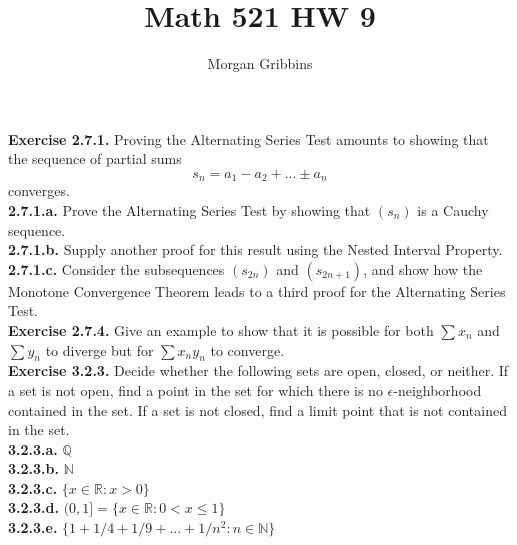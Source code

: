 \documentclass[12pt,letterpaper]{article}
\title{Math 521 HW 9}
\author{Morgan Gribbins}
\date{}
\begin{document}
	
\maketitle

\textbf{Exercise 2.7.1.} Proving the Alternating Series Test amounts to showing that the sequence of partial sums \[s_{n} = a_{1} - a_{2} + ... \pm a_{n}\] converges. \\

\textbf{2.7.1.a.} Prove the Alternating Series Test by showing that \((s_{n})\) is a Cauchy sequence. \\



\textbf{2.7.1.b.} Supply another proof for this result using the Nested Interval Property. \\



\textbf{2.7.1.c.} Consider the subsequences \((s_{2n})\) and \((s_{2n+1})\), and show how the Monotone Convergence Theorem leads to a third proof for the Alternating Series Test. \\



\textbf{Exercise 2.7.4.} Give an example to show that it is possible for both \(\sum x_{n}\) and \(\sum y_{n}\) to diverge but for \(\sum x_{n}y_{n}\) to converge. \\



\textbf{Exercise 3.2.3.} Decide whether the following sets are open, closed, or neither. If a set is not open, find a point in the set for which there is no \(\epsilon\)-neighborhood contained in the set. If a set is not closed, find a limit point that is not contained in the set. \\

\textbf{3.2.3.a.} \(\mathbb{Q}\) \\



\textbf{3.2.3.b.} \(\mathbb{N}\) \\



\textbf{3.2.3.c.} \(\{x \in \mathbb{R} : x > 0\}\) \\



\textbf{3.2.3.d.} \((0, 1] = \{x \in \mathbb{R} : 0 < x \leq 1\}\) \\



\textbf{3.2.3.e.} \(\{1 + 1/4 + 1/9 + ... + 1/n^{2} : n \in \mathbb{N}\}\) \\
\end{document}
